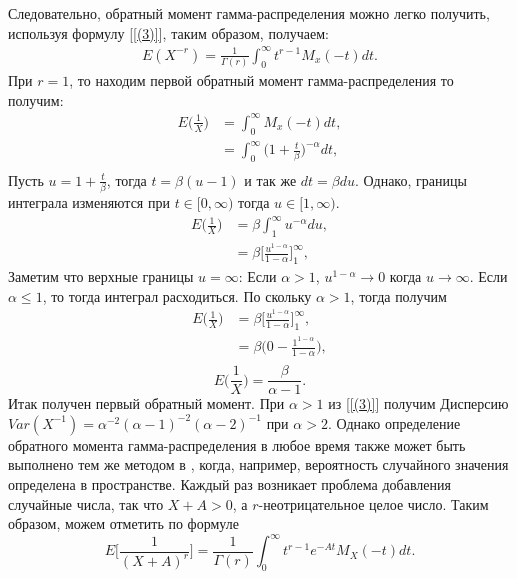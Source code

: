 \documentclass[13pt]{article}
\begin{document}
Следовательно, обратный момент гамма-распределения можно легко получить, используя формулу [\ref{(3)}], таким образом, получаем:
\begin{align*}
    E(X^{-r}) = \frac{1}{\Gamma(r)}\int_{0}^{\infty} t^{r-1}M_{x}(-t)dt.
\end{align*}
При $r=1$, то находим первой обратный момент гамма-распределения то получим:
\begin{align*}
       E\bigg(\frac{1}{X}\bigg) &= \int_{0}^{\infty} M_{x}(-t)dt ,\\
       &= \int_{0}^{\infty} \Bigg(1 + \frac{t}{\beta} \Bigg)^{-\alpha} dt, \\ 
\end{align*}
Пусть $u = 1 + \frac{t}{\beta}$, тогда $t = \beta(u - 1)$ и так же $dt=\beta du$. Однако,  границы интеграла изменяются при $t \in [0, \infty)$ тогда $u \in [1 ,\infty)$.
\begin{align*}
    E\bigg(\frac{1}{X}\bigg) &=  \beta \int_{1}^{\infty} u^{-\alpha} du ,\\
    &=  \beta \bigg[\frac{u^{1-\alpha}}{1- \alpha} \bigg]_{1}^{\infty},
\end{align*}
Заметим что верхные границы $u = \infty$:
Если $\alpha > 1$, $u^{1-\alpha} \to 0$ когда $u \to \infty$. 
Если $\alpha \le 1$, то тогда интеграл расходиться. По скольку $\alpha > 1$, тогда получим 
\begin{align*}
    E\bigg(\frac{1}{X}\bigg)  &=  \beta \bigg[\frac{u^{1-\alpha}}{1- \alpha} \bigg]_{1}^{\infty}, \\
     &=  \beta \bigg(0 - \frac{1^{1 - \alpha}}{1 - \alpha} \bigg), \\
\end{align*}
\begin{equation}\label{eq:30}
    E\bigg(\frac{1}{X}\bigg) =\frac{\beta}{\alpha - 1}.
\end{equation}
Итак получен первый обратный момент. При $\alpha >1$ из [\ref{(3)}] получим Дисперсию $Var(X^{-1})=\alpha^{-2}(\alpha -1)^{-2}(\alpha -2)^{-1}$ при $\alpha >2 $.
Однако определение обратного момента гамма-распределения в любое время также может быть выполнено тем же методом в \cite{chao1972negative}, когда, например, вероятность случайного значения определена в пространстве. Каждый раз возникает проблема добавления случайные числа, так что $X+A>0$, а $r$-неотрицательное целое число. Таким образом, можем отметить по формуле
\begin{equation*}
    E\bigg[\frac{1}{(X+A)^{r}}\bigg] = \frac{1}{\Gamma(r)} \int_{0}^{\infty}t^{r-1}e^{-At}M_{X}(-t)dt.
\end{equation*}
\end{document}
